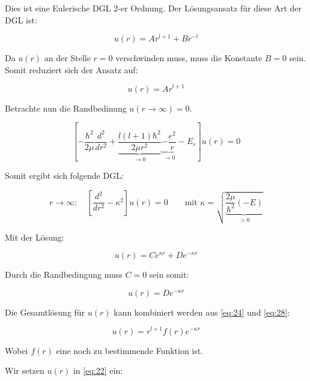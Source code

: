 Dies ist eine Eulerische DGL 2-er Ordnung. Der Lösungsansatz für diese Art der DGL ist:

\begin{equation}
  \label{eq:23}
  u(r) = Ar^{l+1}+Br^{-l}
\end{equation}

Da \(u(r)\) an der Stelle \(r=0\) verschwinden muss, muss die Konstante \(B=0\) sein. Somit reduziert sich der Ansatz auf:

\begin{equation}
  \label{eq:24}
  u(r) = Ar^{l+1}
\end{equation}

Betrachte nun die Randbedinung \(u(r\to \infty) = 0\).

\begin{equation}
  \label{eq:25}
  \left[-\frac{\hbar^2}{2\mu}\frac{d^2}{dr^2} + \underbrace{\frac{l(l+1)\hbar^2}{2\mu r^2}}_{\to 0}  \underbrace{- \frac{e^2}{r} }_{\to 0} - E_r  \right] u(r)   = 0 
\end{equation}

Somit ergibt sich folgende DGL:

\begin{equation}
  \label{eq:26}
  r\to \infty: \quad\left[\frac{d^2}{dr^2} - \kappa^2\right]u(r) = 0 \qquad \text{mit }\kappa = \sqrt{\underbrace{\frac{2\mu}{\hbar^2}(-E)}_{>0}}
\end{equation}

Mit der Lösung:

\begin{equation}
  \label{eq:27}
  u(r) = Ce^{\kappa r}+De^{-\kappa r}
\end{equation}

Durch die Randbedingung muss \(C=0\) sein somit:

\begin{equation}
  \label{eq:28}
    u(r) = De^{-\kappa r}
\end{equation}

Die Gesamtlösung für \(u(r)\) kann kombiniert werden aus \eqref{eq:24} und \eqref{eq:28}:

\begin{equation}
  \label{eq:29}
  u(r) = r^{l+1}f(r)e^{-\kappa r}
\end{equation}

Wobei \(f(r)\) eine noch zu bestimmende Funktion ist.  

Wir setzen \(u(r)\) in \eqref{eq:22} ein:

